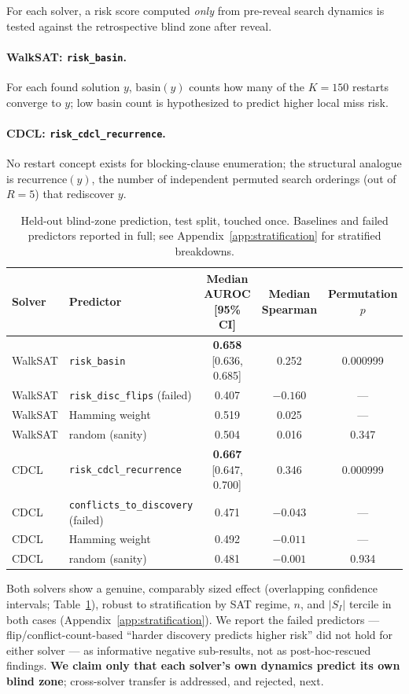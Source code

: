 \documentclass[11pt]{article}
\theoremstyle{definition}
\theoremstyle{remark}
\newcommand{\Shat}{S_I}
\begin{document}
For each solver, a risk score computed \emph{only} from pre-reveal search dynamics is tested against the retrospective blind zone after reveal.

\paragraph{WalkSAT: \texttt{risk\_basin}.} For each found solution $y$, $\mathrm{basin}(y)$ counts how many of the $K=150$ restarts converge to $y$; low basin count is hypothesized to predict higher local miss risk.

\paragraph{CDCL: \texttt{risk\_cdcl\_recurrence}.} No restart concept exists for blocking-clause enumeration; the structural analogue is $\mathrm{recurrence}(y)$, the number of independent permuted search orderings (out of $R=5$) that rediscover $y$.

\begin{table}[htbp]
\centering
\caption{Held-out blind-zone prediction, test split, touched once. Baselines and failed predictors reported in full; see Appendix~\ref{app:stratification} for stratified breakdowns.}
\label{tab:prediction}
\footnotesize
\begin{tabular}{@{}llccc@{}}
\toprule
Solver & Predictor & Median AUROC [95\% CI] & Median Spearman & Permutation $p$ \\
\midrule
WalkSAT & \texttt{risk\_basin} & \textbf{0.658} [0.636, 0.685] & 0.252 & 0.000999 \\
WalkSAT & \texttt{risk\_disc\_flips} (failed) & 0.407 & $-0.160$ & --- \\
WalkSAT & Hamming weight & 0.519 & 0.025 & --- \\
WalkSAT & random (sanity) & 0.504 & 0.016 & 0.347 \\
\addlinespace
CDCL & \texttt{risk\_cdcl\_recurrence} & \textbf{0.667} [0.647, 0.700] & 0.346 & 0.000999 \\
CDCL & \texttt{conflicts\_to\_discovery} (failed) & 0.471 & $-0.043$ & --- \\
CDCL & Hamming weight & 0.492 & $-0.011$ & --- \\
CDCL & random (sanity) & 0.481 & $-0.001$ & 0.934 \\
\bottomrule
\end{tabular}
\end{table}

Both solvers show a genuine, comparably sized effect (overlapping confidence intervals; Table~\ref{tab:prediction}), robust to stratification by SAT regime, $n$, and $|\Shat|$ tercile in both cases (Appendix~\ref{app:stratification}). We report the failed predictors --- flip/conflict-count-based ``harder discovery predicts higher risk'' did not hold for either solver --- as informative negative sub-results, not as post-hoc-rescued findings. \textbf{We claim only that each solver's own dynamics predict its own blind zone}; cross-solver transfer is addressed, and rejected, next.
\end{document}
